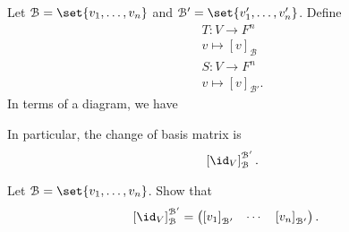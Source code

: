\documentclass[10pt]{mypackage}
\begin{document}
Let $\mathcal{B} = \set{v_1,\dots,v_n}$ and $\mathcal{B}' = \set{v_1',\dots,v_n'}$. Define
\begin{align*}
  T: V\rightarrow F^{n}\\
  v\mapsto \left[v\right]_{\mathcal{B}}\\
  S: V\rightarrow F^{n}\\
  v\mapsto \left[v\right]_{\mathcal{B}'}.
\end{align*}
In terms of a diagram, we have
\begin{center}
\end{center}
In particular, the change of basis matrix is
\begin{align*}
  \left[\id_{V}\right]_{\mathcal{B}}^{\mathcal{B}'}.
\end{align*}
\begin{exercise}
  Let $\mathcal{B} = \set{v_1,\dots,v_n}$. Show that
  \begin{align*}
    \left[\id_{V}\right]_{\mathcal{B}}^{\mathcal{B}'} &= \begin{pmatrix}\left[v_1\right]_{\mathcal{B'}} & \cdots & \left[v_n\right]_{\mathcal{B}'}\end{pmatrix}.
  \end{align*}
\end{exercise}
\end{document}
